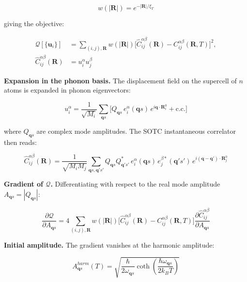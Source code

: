 \documentclass[aps,prb,reprint,amsmath,amssymb,floatfix]{revtex4-2}
\begin{document}
\begin{equation*}
w(|\mathbf{R}|) = e^{-|\mathbf{R}|/\xi_T}
\end{equation*}

giving the objective:

\begin{align*}
\mathcal{Q}[\{\mathbf{u}_i\}]
  &= \sum_{(i,j),\mathbf{R}} w(|\mathbf{R}|)\bigl[\hat{C}_{ij}^{\alpha\beta}(\mathbf{R}) - C_{ij}^{\alpha\beta}(\mathbf{R},T)\bigr]^2, \\
\hat{C}_{ij}^{\alpha\beta}(\mathbf{R})
  &= u_i^\alpha u_j^\beta
\end{align*}

\textbf{Expansion in the phonon basis.} The displacement field on the
supercell of \(n\) atoms is expanded in phonon eigenvectors:

\begin{equation*}
u_i^\alpha = \frac{1}{\sqrt{M_i}}\sum_{\mathbf{q}s}\bigl[Q_{\mathbf{q}s}\,e_i^\alpha(\mathbf{q}s)\,e^{i\mathbf{q}\cdot\mathbf{R}_i^0} + \text{c.c.}\bigr]
\end{equation*}

where \(Q_{\mathbf{q}s}\) are complex mode amplitudes. The SOTC
instantaneous correlator then reads:

{\small
\begin{equation*}
\hat{C}_{ij}^{\alpha\beta}(\mathbf{R}) = \frac{1}{\sqrt{M_iM_j}}\sum_{\mathbf{q}s,\mathbf{q}'s'} Q_{\mathbf{q}s}Q_{\mathbf{q}'s'}^*\, e_i^\alpha(\mathbf{q}s)\,e_j^{\beta*}(\mathbf{q}'s')\, e^{i(\mathbf{q}-\mathbf{q}')\cdot\mathbf{R}_j^0}
\end{equation*}
}

\textbf{Gradient of \(\mathcal{Q}\).} Differentiating with respect to
the real mode amplitude \(A_{\mathbf{q}s} = |Q_{\mathbf{q}s}|\):

{\small
\begin{equation*}
\frac{\partial\mathcal{Q}}{\partial A_{\mathbf{q}s}} = 4\sum_{(i,j),\mathbf{R}} w(|\mathbf{R}|)\bigl[\hat{C}_{ij}^{\alpha\beta}(\mathbf{R}) - C_{ij}^{\alpha\beta}(\mathbf{R},T)\bigr]\frac{\partial\hat{C}_{ij}^{\alpha\beta}}{\partial A_{\mathbf{q}s}}
\end{equation*}
}

\textbf{Initial amplitude.} The gradient vanishes at the harmonic
amplitude:

\begin{equation*}
A_{\mathbf{q}s}^{harm}(T) = \sqrt{\frac{\hbar}{2\omega_{\mathbf{q}s}}\coth\!\left(\frac{\hbar\omega_{\mathbf{q}s}}{2k_BT}\right)}
\end{equation*}
\end{document}
